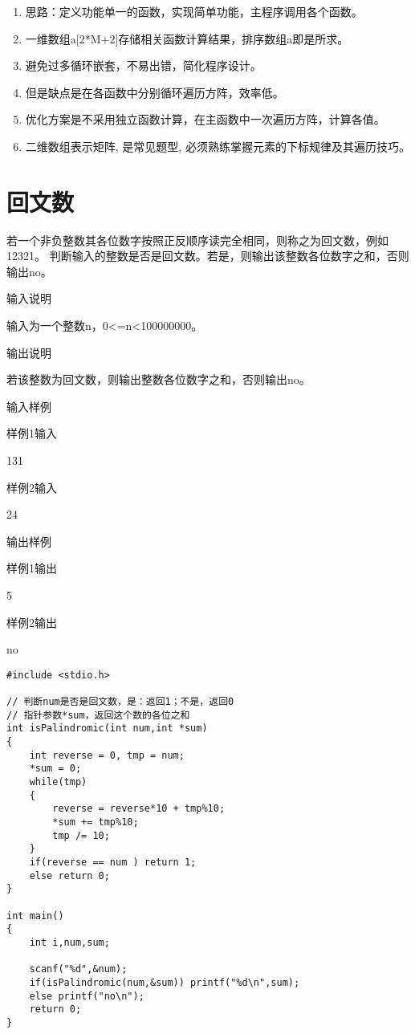 \begin{note}[要点]
	\begin{enumerate}
		\item 思路：定义功能单一的函数，实现简单功能，主程序调用各个函数。
		\item 一维数组a[2*M+2]存储相关函数计算结果，排序数组a即是所求。 
		\item 避免过多循环嵌套，不易出错，简化程序设计。 
		\item 但是缺点是在各函数中分别循环遍历方阵，效率低。
		\item 优化方案是不采用独立函数计算，在主函数中一次遍历方阵，计算各值。 
		\item 二维数组表示矩阵, 是常见题型, 必须熟练掌握元素的下标规律及其遍历技巧。
		\end{enumerate}
\end{note}

\section{回文数}
若一个非负整数其各位数字按照正反顺序读完全相同，则称之为回文数，例如12321。
判断输入的整数是否是回文数。若是，则输出该整数各位数字之和，否则输出no。

输入说明	

输入为一个整数n，0<=n<100000000。

输出说明	

若该整数为回文数，则输出整数各位数字之和，否则输出no。

输入样例
	
样例1输入

131

样例2输入

24

输出样例

样例1输出
	
5

样例2输出

no

\begin{lstlisting}
#include <stdio.h>

// 判断num是否是回文数，是：返回1；不是，返回0
// 指针参数*sum，返回这个数的各位之和  
int isPalindromic(int num,int *sum)
{
	int reverse = 0, tmp = num;
	*sum = 0; 
	while(tmp)
	{
		reverse = reverse*10 + tmp%10;
		*sum += tmp%10;
		tmp /= 10;
	}
	if(reverse == num ) return 1;
	else return 0;	
}

int main()
{
	int i,num,sum;
	
	scanf("%d",&num); 
	if(isPalindromic(num,&sum)) printf("%d\n",sum);
	else printf("no\n");
	return 0;
} 
\end{lstlisting}

